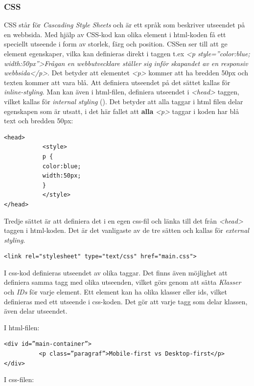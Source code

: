 \documentclass[11pt]{article}
\begin{document}
\subsubsection{CSS}
CSS står för \textit{Cascading Style Sheets} och är ett språk som beskriver utseendet på en webbsida.
Med hjälp av CSS-kod kan olika element i html-koden få ett speciellt utseende i form av storlek, färg och position. CSSen ser till att ge element egenskaper, vilka kan definieras direkt i taggen t.ex \textit{<p style=”color:blue; width:50px”>Frågan en webbutvecklare ställer sig inför skapandet av en responsiv webbsida</p>}. Det betyder att elementet \textit{<p>} kommer att ha bredden 50px och texten kommer att vara blå. Att definiera utseendet på det sättet kallas för \textit{inline-styling}. Man kan även i html-filen, definiera utseendet i \textit{<head>} taggen, vilket kallas för \textit{internal styling} (\cite{css}). Det betyder att alla taggar i html filen delar egenskapen som är utsatt, i det här fallet att \textbf{alla} \textit{<p>} taggar i koden har blå text och bredden 50px:

\vspace{0.3cm}
\begin{verbatim}
<head>
           <style>
           p {
           color:blue;
           width:50px;
           }
           </style>
</head>
\end{verbatim}
\vspace{0.3cm}

Tredje sättet är att definiera det i en egen css-fil och länka till det från \textit{<head>} taggen i html-koden. Det är det vanligaste av de tre sätten och kallas för \textit{external styling}.
\vspace{0.3cm}
\begin{verbatim}
<link rel="stylesheet" type="text/css" href="main.css">
\end{verbatim}
\vspace{0.3cm}

I css-kod definieras utseendet av olika taggar. Det finns även möjlighet att definiera samma tagg med olika utseenden, vilket görs genom att sätta \textit{Klasser} och \textit{IDs} för varje element. Ett element kan ha olika klasser eller ids, vilket definieras med ett utseende i css-koden. Det gör att varje tagg som delar klassen, även delar utseendet.

\vspace{0.3cm}
I html-filen:

\begin{verbatim}
<div id=”main-container”>
          <p class=”paragraf”>Mobile-first vs Desktop-first</p>
</div>
\end{verbatim}
\vspace{0.4cm}
I css-filen:
\end{document}
